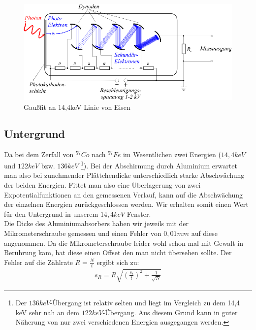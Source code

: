 \documentclass[12pt]{article}
\begin{document}
\begin{figure}[H]
 \includegraphics[width=0.9\linewidth]{pictures/photomultiplier_schema.eps}
 \caption{Gaußfit an 14,4keV Linie von Eisen}
\end{figure}

\subsection{Untergrund}
Da bei dem Zerfall von $^{57}Co$ nach $^{57}Fe$ im Wesentlichen zwei Energien ($14,4 keV$ und $122 keV$ bzw. $136 keV$
\footnote{Der $136 keV$-Übergang ist relativ selten und liegt im Vergleich zu dem 14,4 keV sehr nah an dem $122 keV$-Übergang. Aus diesem Grund kann in guter
Näherung von nur zwei verschiedenen Energien ausgegangen werden.}). Bei der Abschirmung durch Aluminium erwartet man also bei zunehmender Plättchendicke
unterschiedlich starke Abschwächung der beiden Energien. Fittet man also eine Überlagerung von zwei Expotentialfunktionen an den gemessenen Verlauf, kann auf
die Abschwächung der einzelnen Energien zurückgeschlossen werden. Wir erhalten somit einen Wert für den Untergrund in unserem $14,4 keV$ Fenster.\\

Die Dicke des Aluminiumabsorbers haben wir jeweils mit der Mikrometerschraube gemessen und einen Fehler von $0,01 mm$ auf diese angenommen. Da die Mikrometerschraube leider wohl schon mal mit Gewalt in Berührung kam, hat diese einen Offset den man nicht übersehen sollte.
Der Fehler auf die Zählrate $R = \frac{N}{t}$ ergibt sich zu:
\begin{align}
 s_R = R \sqrt{\left(\frac{s_t}{t}\right)^2 + \frac{1}{\sqrt{N}}}
\end{align}
\end{document}
